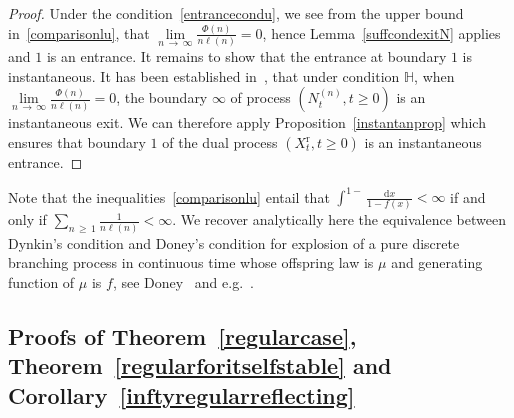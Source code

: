 \documentclass[AHL,Unicode,longabstracts,published]{cedram}
\newcommand{\ddr}{\mathrm{d}}
\newcommand{\rmr}{\mathrm{r}}
\newcommand{\bbH}{\mathbb{H}}
\begin{document}
\begin{proof}
Under the condition~\eqref{entrancecondu}, we see from the upper bound in~\eqref{comparisonlu}, that $\underset{n\,\rightarrow\,\infty}{\lim}\frac{\Phi(n)}{n\ell(n)}=0$, hence Lemma~\ref{suffcondexitN} applies and $1$ is an entrance. It remains to show that the entrance at boundary $1$ is instantaneous. It has been established in~\cite[Proposition~5.2]{explosion}, that under condition $\bbH$, when $\underset{n\,\rightarrow\,\infty}{\lim} \frac{\Phi(n)}{n\ell(n)}=0$, the boundary $\infty$ of process $(N_t^{(n)},t\geq 0)$ is an instantaneous exit. We can therefore apply Proposition~\ref{instantanprop} which ensures that boundary $1$ of the dual process $(X_t^{\rmr},t\geq 0)$ is an instantaneous entrance.
\end{proof}


\begin{rema}\label{tauberianremark}
Note that the inequalities~\eqref{comparisonlu} entail that
$\int^{1-}\frac{\ddr x}{1-f(x)}<\infty$ if and only if $\sum_{n\,\geq\,1}\frac{1}{n\ell(n)}<\infty$. We recover analytically here the equivalence between Dynkin's condition and Doney's condition for explosion of a pure discrete branching process in continuous time whose offspring law is $\mu$ and generating function of $\mu$ is $f$, see Doney~\cite{Doney1984} and e.g.~\cite[Section~2.4]{explosion}.
\end{rema}

\subsection{Proofs of Theorem~\ref{regularcase}, Theorem~\ref{regularforitselfstable} and Corollary~\ref{inftyregularreflecting}}
\end{document}
